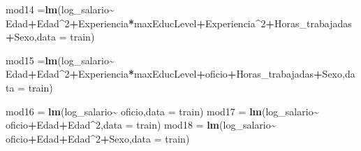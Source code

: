 \documentclass[
]{article}
\newenvironment{Shaded}{\begin{snugshade}}{\end{snugshade}}
\newcommand{\AttributeTok}[1]{\textcolor[rgb]{0.13,0.29,0.53}{#1}}
\newcommand{\DecValTok}[1]{\textcolor[rgb]{0.00,0.00,0.81}{#1}}
\newcommand{\FunctionTok}[1]{\textcolor[rgb]{0.13,0.29,0.53}{\textbf{#1}}}
\newcommand{\NormalTok}[1]{#1}
\newcommand{\OtherTok}[1]{\textcolor[rgb]{0.56,0.35,0.01}{#1}}
\newcommand{\SpecialCharTok}[1]{\textcolor[rgb]{0.81,0.36,0.00}{\textbf{#1}}}
\begin{document}
\begin{Shaded}
\begin{Highlighting}[]
\NormalTok{mod14 }\OtherTok{=}\FunctionTok{lm}\NormalTok{(log\_salario}\SpecialCharTok{\textasciitilde{}}\NormalTok{ Edad}\SpecialCharTok{+}\NormalTok{Edad}\SpecialCharTok{\^{}}\DecValTok{2}\SpecialCharTok{+}\NormalTok{Experiencia}\SpecialCharTok{*}\NormalTok{maxEducLevel}\SpecialCharTok{+}\NormalTok{Experiencia}\SpecialCharTok{\^{}}\DecValTok{2}\SpecialCharTok{+}\NormalTok{Horas\_trabajadas}\SpecialCharTok{+}\NormalTok{Sexo,}\AttributeTok{data =}\NormalTok{ train)}

\NormalTok{mod15 }\OtherTok{=}\FunctionTok{lm}\NormalTok{(log\_salario}\SpecialCharTok{\textasciitilde{}}\NormalTok{ Edad}\SpecialCharTok{+}\NormalTok{Edad}\SpecialCharTok{\^{}}\DecValTok{2}\SpecialCharTok{+}\NormalTok{Experiencia}\SpecialCharTok{*}\NormalTok{maxEducLevel}\SpecialCharTok{+}\NormalTok{oficio}\SpecialCharTok{+}\NormalTok{Horas\_trabajadas}\SpecialCharTok{+}\NormalTok{Sexo,}\AttributeTok{data =}\NormalTok{ train)}

\NormalTok{mod16 }\OtherTok{=} \FunctionTok{lm}\NormalTok{(log\_salario}\SpecialCharTok{\textasciitilde{}}\NormalTok{ oficio,}\AttributeTok{data =}\NormalTok{ train)}
\NormalTok{mod17 }\OtherTok{=} \FunctionTok{lm}\NormalTok{(log\_salario}\SpecialCharTok{\textasciitilde{}}\NormalTok{ oficio}\SpecialCharTok{+}\NormalTok{Edad}\SpecialCharTok{+}\NormalTok{Edad}\SpecialCharTok{\^{}}\DecValTok{2}\NormalTok{,}\AttributeTok{data =}\NormalTok{ train)}
\NormalTok{mod18 }\OtherTok{=} \FunctionTok{lm}\NormalTok{(log\_salario}\SpecialCharTok{\textasciitilde{}}\NormalTok{ oficio}\SpecialCharTok{+}\NormalTok{Edad}\SpecialCharTok{+}\NormalTok{Edad}\SpecialCharTok{\^{}}\DecValTok{2}\SpecialCharTok{+}\NormalTok{Sexo,}\AttributeTok{data =}\NormalTok{ train)}
\end{Highlighting}
\end{Shaded}
\end{document}

